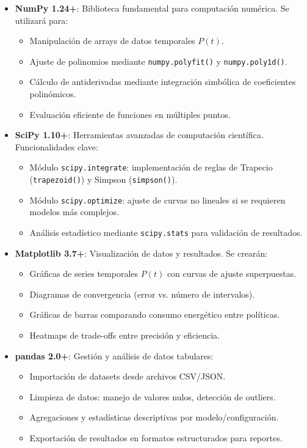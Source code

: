 \begin{itemize}
    \item \textbf{NumPy 1.24+}: Biblioteca fundamental para computación numérica. Se utilizará para:
    \begin{itemize}
        \item Manipulación de arrays de datos temporales $P(t)$.
        \item Ajuste de polinomios mediante \texttt{numpy.polyfit()} y \texttt{numpy.poly1d()}.
        \item Cálculo de antiderivadas mediante integración simbólica de coeficientes polinómicos.
        \item Evaluación eficiente de funciones en múltiples puntos.
    \end{itemize}
    
    \item \textbf{SciPy 1.10+}: Herramientas avanzadas de computación científica. Funcionalidades clave:
    \begin{itemize}
        \item Módulo \texttt{scipy.integrate}: implementación de reglas de Trapecio (\texttt{trapezoid()}) y Simpson (\texttt{simpson()}).
        \item Módulo \texttt{scipy.optimize}: ajuste de curvas no lineales si se requieren modelos más complejos.
        \item Análisis estadístico mediante \texttt{scipy.stats} para validación de resultados.
    \end{itemize}
    
    \item \textbf{Matplotlib 3.7+}: Visualización de datos y resultados. Se crearán:
    \begin{itemize}
        \item Gráficas de series temporales $P(t)$ con curvas de ajuste superpuestas.
        \item Diagramas de convergencia (error vs. número de intervalos).
        \item Gráficas de barras comparando consumo energético entre políticas.
        \item Heatmaps de trade-offs entre precisión y eficiencia.
    \end{itemize}
    
    \item \textbf{pandas 2.0+}: Gestión y análisis de datos tabulares:
    \begin{itemize}
        \item Importación de datasets desde archivos CSV/JSON.
        \item Limpieza de datos: manejo de valores nulos, detección de outliers.
        \item Agregaciones y estadísticas descriptivas por modelo/configuración.
        \item Exportación de resultados en formatos estructurados para reportes.
    \end{itemize}
    

\end{itemize}
